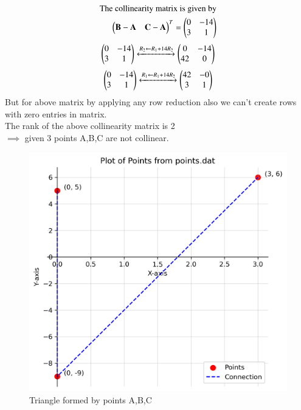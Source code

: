 \documentclass[journal]{IEEEtran}
\begin{document}
\begin{align}
\text{The collinearity matrix is given by}\\
\begin{pmatrix}
   \mathbf{B}-\mathbf{A} & \mathbf{C}-\mathbf{A}
 \end{pmatrix}^T = \begin{pmatrix}
   0 & -14 
   \\
   3 & 1
   \end{pmatrix}\\
\end{align}
\begin{align}
    \begin{pmatrix}
   0 & -14 
   \\
   3 & 1
   \end{pmatrix}
   \xleftrightarrow[]{R_2 \leftarrow {R_1+14R_2}}
   \begin{pmatrix}
   0 & -14
   \\
   42 & 0
   \end{pmatrix}\\
 \end{align}
 \begin{align}
     \begin{pmatrix}
   0 & -14
   \\
   3 & 1
   \end{pmatrix}
   \xleftrightarrow[]{R_1 \leftarrow {R_1+14R_2}}
   \begin{pmatrix}
   42 & -0
   \\
   3 & 1
   \end{pmatrix}
\end{align}
 But  for above matrix by applying any row reduction also we can't create  rows with zero entries in matrix.\\
 The rank of the above collinearity matrix is 2\\
 $\implies$ given 3 points A,B,C are not collinear.
 \begin{figure}[h!]
   \centering
   \includegraphics[width=0.5\linewidth]{figs/01.png}
   \caption{Triangle formed by points A,B,C}
   \label{}
\end{figure}
\end{document}
